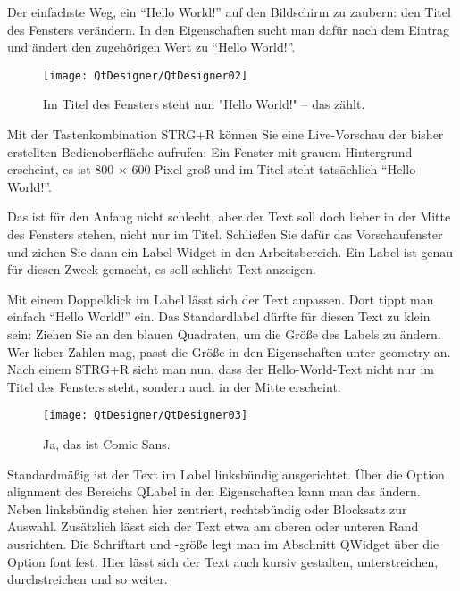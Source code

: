 Der einfachste Weg, ein ``Hello World!'' auf den Bildschirm zu zaubern: den Titel des Fensters verändern. In den Eigenschaften sucht man dafür nach dem Eintrag  und ändert den zugehörigen Wert zu ``Hello World!''.


\begin{figure}
    \begin{center}
        \texttt{[image: QtDesigner/QtDesigner02]}
        \caption{Im Titel des Fensters steht nun "Hello World!" – das zählt.}
    \end{center}
\end{figure}



Mit der Tastenkombination STRG+R können Sie eine Live-Vorschau der bisher erstellten Bedienoberfläche aufrufen: Ein Fenster mit grauem Hintergrund erscheint, es ist 800 × 600 Pixel groß und im Titel steht tatsächlich ``Hello World!''.

Das ist für den Anfang nicht schlecht, aber der Text soll doch lieber in der Mitte des Fensters stehen, nicht nur im Titel. Schließen Sie dafür das Vorschaufenster und ziehen Sie dann ein Label-Widget in den Arbeitsbereich. Ein Label ist genau für diesen Zweck gemacht, es soll schlicht Text anzeigen.

Mit einem Doppelklick im Label lässt sich der Text anpassen. Dort tippt man einfach ``Hello World!'' ein. Das Standardlabel dürfte für diesen Text zu klein sein: Ziehen Sie an den blauen Quadraten, um die Größe des Labels zu ändern. Wer lieber Zahlen mag, passt die Größe in den Eigenschaften unter geometry an. Nach einem STRG+R sieht man nun, dass der Hello-World-Text nicht nur im Titel des Fensters steht, sondern auch in der Mitte erscheint.

\begin{figure}
    \begin{center}
        \texttt{[image: QtDesigner/QtDesigner03]}
        \caption{Ja, das ist Comic Sans.}
    \end{center}
\end{figure}



Standardmäßig ist der Text im Label linksbündig ausgerichtet. Über die Option alignment des Bereichs QLabel in den Eigenschaften kann man das ändern. Neben linksbündig stehen hier zentriert, rechtsbündig oder Blocksatz zur Auswahl. Zusätzlich lässt sich der Text etwa am oberen oder unteren Rand ausrichten. Die Schriftart und -größe legt man im Abschnitt QWidget über die Option font fest. Hier lässt sich der Text auch kursiv gestalten, unterstreichen, durchstreichen und so weiter.


